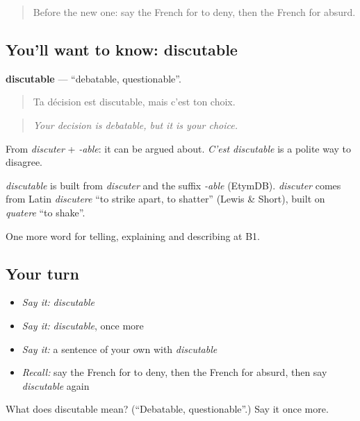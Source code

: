 \label{lesson:FR-C338-discutable}



\begin{quote}
Before the new one: say the French for to deny, then the French for absurd.
\end{quote}

\subsection*{You'll want to know: discutable}
\textbf{discutable} — \textquotedblleft{}debatable, questionable\textquotedblright{}.

\begin{quote}
Ta décision est discutable, mais c'est ton choix.
\end{quote}

\begin{quote}
\emph{Your decision is debatable, but it is your choice.}
\end{quote}

From \emph{discuter} + \emph{-able}: it can be argued about. \emph{C'est discutable} is a polite way to disagree.

\begin{cousinweb}
\emph{discutable} is built from \emph{discuter} and the suffix \emph{-able} (EtymDB). \emph{discuter} comes from Latin \emph{discutere} \textquotedblleft{}to strike apart, to shatter\textquotedblright{} (Lewis \& Short), built on \emph{quatere} \textquotedblleft{}to shake\textquotedblright{}.
\end{cousinweb}

\begin{grammarlens}[title={What you've built}]
One more word for telling, explaining and describing at B1.
\end{grammarlens}

\subsection*{Your turn}
\begin{itemize}
\raggedright
  \item \emph{Say it:} \emph{discutable}
  \item \emph{Say it:} \emph{discutable}, once more
  \item \emph{Say it:} a sentence of your own with \emph{discutable}
  \item \emph{Recall:} say the French for to deny, then the French for absurd, then say \emph{discutable} again
\end{itemize}

\begin{tcolorbox}[breakable,colback=teal!4,colframe=teal!35!black,title={Before you move on}]
What does discutable mean? (\textquotedblleft{}Debatable, questionable\textquotedblright{}.) Say it once more.
\end{tcolorbox}
